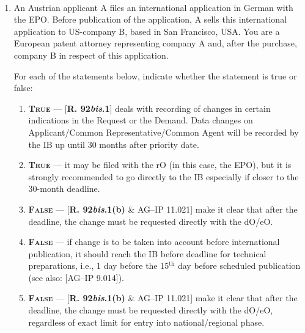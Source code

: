 \documentclass{report}
\newcommand{\p}{\adforn{61} \ }
\begin{document}
\begin{center}

\p \p \p
 
\end{center}

\begin{enumerate}[label=\textbf{Answer \arabic*}]

    \item %
   An Austrian applicant A files an international application in German with the EPO. Before publication of the application, A sells this international application to US-company B, based in San Francisco, USA.
You are a European patent attorney representing company A and, after the purchase, company B in respect of this application.


For each of the statements below, indicate whether the statement is true or false:

    \begin{enumerate}[label=(\alph*)]
        \item  \textbf{\textsc{True}} --- [\textbf{R. 92\textit{bis}.1}] deals with recording of changes in certain indications
in the Request or the Demand. Data changes on Applicant/Common Representative/Common Agent will be recorded by the IB up until 30 months after priority date. 
\item  \textbf{\textsc{True}} --- it may be filed with the rO (in this case, the EPO), but it is strongly recommended to go directly to the IB especially if closer to the 30-month deadline. 
\item  \textbf{\textsc{False}} --- [\textbf{R. 92\textit{bis}.1(b)} \& \textsc{AG--IP 11.021}] make it clear that after the deadline, the change must be requested directly with the dO/eO. 
\item \textbf{\textsc{False}} --- if change is to be taken into account before international publication, it should reach the IB before deadline for technical preparations, i.e., 1 day before the 15$^{\mathrm{th}}$ day before scheduled publication (see also: [\textsc{AG--IP 9.014}]).
\item \textbf{\textsc{False}} --- [\textbf{R. 92\textit{bis}.1(b)} \& \textsc{AG--IP 11.021}] make it clear that after the deadline, the change must be requested directly with the dO/eO, regardless of exact limit for entry into national/regional phase. 
    \end{enumerate}




\end{enumerate}
\end{document}
